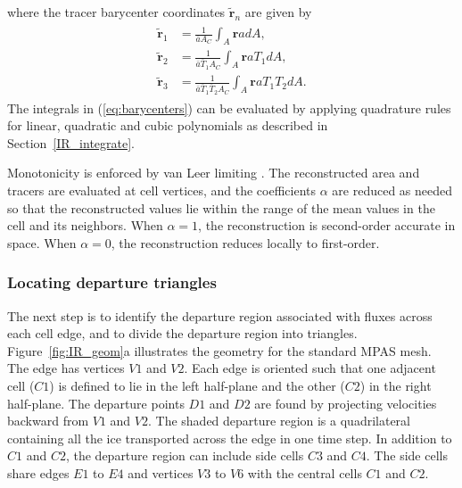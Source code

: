 where the tracer barycenter coordinates $\mathbf{\tilde{r}}_n$ are given by
\begin{align}
\begin{split}
\label{eq:barycenters}
   {{{\mathbf{\tilde{r}}}}_{1}} & = \frac{1}{\bar{a}{{A}_{C}}}\int_{A}{\mathbf{r}adA,}  \\
   {{{\mathbf{\tilde{r}}}}_{2}} & = \frac{1}{\bar{a}{{{\bar{T}}}_{1}}{{A}_{C}}}\int_{A}{\mathbf{r}a{{T}_{1}}dA,}  \\
   {{{\mathbf{\tilde{r}}}}_{3}} & = \frac{1}{\bar{a}{{{\bar{T}}}_{1}}{{{\bar{T}}}_{2}}{{A}_{C}}}\int_{A}{\mathbf{r}a{{T}_{1}}{{T}_{2}}dA.}
\end{split}
\end{align}
The integrals in (\ref{eq:barycenters}) can be evaluated by applying quadrature rules for linear, quadratic and cubic polynomials as described in Section~\ref{IR_integrate}.

Monotonicity is enforced by van Leer limiting \citep{vanLeer79}. The reconstructed area and tracers are evaluated at cell vertices, and the coefficients $\alpha$  are reduced as needed so that the reconstructed values lie within the range of the mean values in the cell and its neighbors. When $\alpha = 1$, the reconstruction is second-order accurate in space. When $\alpha = 0$, the reconstruction reduces locally to first-order.

\subsubsection{Locating departure triangles}
\label{IR_triangles}

The next step is to identify the departure region associated with fluxes across each cell edge, and to divide the departure region into triangles. Figure~\ref{fig:IR_geom}a illustrates the geometry for the standard MPAS mesh. The edge has vertices $V1$ and $V2$. Each edge is oriented such that one adjacent cell ($C1$) is defined to lie in the left half-plane and the other ($C2$) in the right half-plane. The departure points $D1$ and $D2$ are found by projecting velocities backward from $V1$ and $V2$. The shaded departure region is a quadrilateral containing all the ice transported across the edge in one time step. In addition to $C1$ and $C2$, the departure region can include side cells $C3$ and $C4$. The side cells share edges $E1$ to $E4$ and vertices $V3$ to $V6$ with the central cells $C1$ and $C2$.

